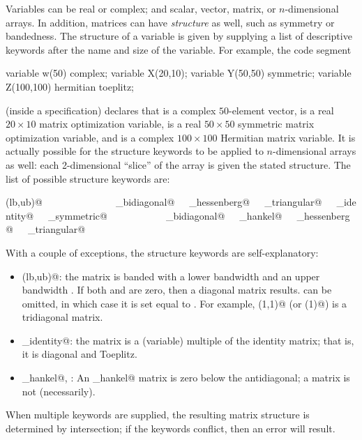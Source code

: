 \documentclass[12pt]{article}
\begin{document}
Variables can be real or complex; and scalar, vector,
matrix, or $n$-dimensional arrays. In addition, matrices can have \emph{structure}
as well, such as symmetry or bandedness. The structure of a variable
is given by supplying a list of descriptive keywords after the name
and size of the variable.
For example, the code segment
\begin{code}
	variable w(50) complex;
	variable X(20,10);
	variable Y(50,50) symmetric;
	variable Z(100,100) hermitian toeplitz;
\end{code}
(inside a \cvx specification) declares that \verb@w@ is a complex
$50$-element vector, \verb@X@ is
a real $20 \times 10$ matrix optimization variable, \verb@Y@ is
a real $50 \times 50$ symmetric matrix optimization variable,
and \verb@Z@ is a complex $100 \times 100$ Hermitian matrix variable.
It is actually possible for the structure keywords to be applied to
$n$-dimensional arrays as well:
each 2-dimensional ``slice'' of the array
is given the stated structure. The list of possible structure
keywords are:
\begin{center}
\verb@banded(lb,ub)@\ \ \ \verb@complex@\ \ \ \verb@diagonal@\ \ \ \verb@hankel@\ \ \ \verb@hermitian@\ \ \ 
\verb@lower_bidiagonal@\ \ \ \verb@lower_hessenberg@\ \ \ \verb@lower_triangular@\ \ \ \verb@scaled_identity@\ \ \ 
\verb@skew_symmetric@\ \ \ \verb@symmetric@\ \ \ \verb@toeplitz@\ \ \ \verb@tridiagonal@\ \ \ 
\verb@upper_bidiagonal@\ \ \ \verb@upper_hankel@\ \ \ \verb@upper_hessenberg@\ \ \ \verb@upper_triangular@\ \ \ 
\end{center}
With a couple of exceptions, the structure keywords are self-explanatory:
\begin{itemize}
\item \verb@banded(lb,ub)@: the matrix is banded with a lower bandwidth \verb@lb@
and an upper bandwidth \verb@ub@. If both \verb@lb@ and \verb@ub@ are zero, then a 
diagonal matrix results. \verb@ub@ can be omitted, in which case it is set equal to \verb@lb@.
For example, \verb@banded(1,1)@ (or \verb@banded(1)@) is a tridiagonal matrix.
\item \verb@scaled_identity@: the matrix is a (variable) multiple of the identity matrix; that is,
it is diagonal and Toeplitz.
\item \verb@upper_hankel@, \verb@hankel@: An \verb@upper_hankel@ matrix is zero below
the antidiagonal; a \verb@hankel@ matrix is not (necessarily).
\end{itemize}
When multiple keywords are supplied, the resulting matrix structure is
determined by intersection; if the keywords conflict, then an error will result.
\end{document}
